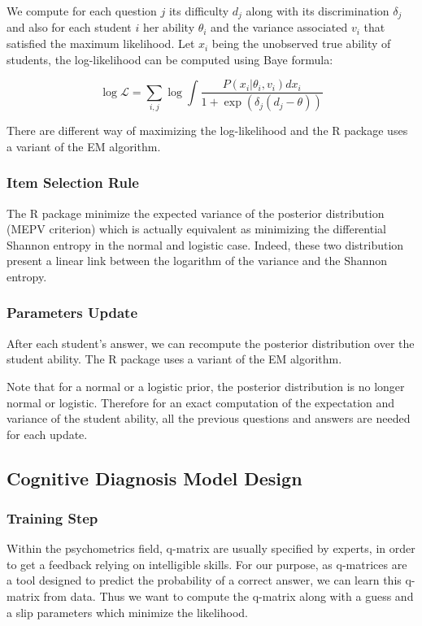 \documentclass{sig-alternate}
\begin{document}
We compute for each question $j$ its difficulty $d_j$ along with its discrimination $\delta_j$ and also for each student $i$ her ability $\theta_i$ and the variance associated $v_i$ that satisfied the maximum likelihood. Let $x_i$ being the unobserved true ability of students, the log-likelihood can be computed using Baye formula: 

\[\log \mathcal{L} = \sum_{i,j} \log \int \frac{P(x_i | \theta_i, v_i)dx_i}{1+\exp(\delta_j (d_j - \theta))}\]

There are different way of maximizing the log-likelihood and the R package uses a variant of the EM algorithm. 

\subsubsection{Item Selection Rule}

The R package minimize the expected variance of the posterior distribution (MEPV criterion) which is actually equivalent as minimizing the differential Shannon entropy in the normal and logistic case. Indeed, these two distribution present a linear link between the logarithm of the variance and the Shannon entropy.  %

\subsubsection{Parameters Update}

After each student's answer, we can recompute the posterior distribution over the student ability. The R package uses a variant of the EM algorithm. 

Note that for a normal or a logistic prior, the posterior distribution is no longer normal or logistic. Therefore for an exact computation of the expectation and variance of the student ability, all the previous questions and answers are needed for each update. 

\subsection{Cognitive Diagnosis Model Design}

\subsubsection{Training Step}

Within the psychometrics field, q-matrix are usually specified by experts, in order to get a feedback relying on intelligible skills. For our purpose, as q-matrices are a tool designed to predict the probability of a correct answer, we can learn this q-matrix from data. Thus we want to compute the q-matrix along with a guess and a slip parameters which minimize the likelihood.
\end{document}
